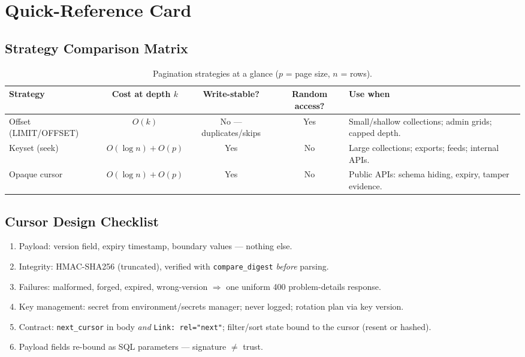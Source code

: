 \section{Quick-Reference Card}
\label{sec:ch8-quickref}

\subsection*{Strategy Comparison Matrix}
\begin{table}[h]
  \centering
  \small
  \begin{tabularx}{\textwidth}{l c c c X}
    \toprule
    \textbf{Strategy} & \textbf{Cost at depth $k$} & \textbf{Write-stable?} &
    \textbf{Random access?} & \textbf{Use when} \\
    \midrule
    Offset (LIMIT/OFFSET) & $O(k)$ & No --- duplicates/skips & Yes &
      Small/shallow collections; admin grids; capped depth. \\
    Keyset (seek) & $O(\log n) + O(p)$ & Yes & No &
      Large collections; exports; feeds; internal APIs. \\
    Opaque cursor & $O(\log n) + O(p)$ & Yes & No &
      Public APIs: schema hiding, expiry, tamper evidence. \\
    \bottomrule
  \end{tabularx}
  \caption{Pagination strategies at a glance ($p$ = page size, $n$ = rows).}
\end{table}

\subsection*{Cursor Design Checklist}
\begin{enumerate}
  \item Payload: version field, expiry timestamp, boundary values ---
        nothing else.
  \item Integrity: HMAC-SHA256 (truncated), verified with
        \texttt{compare\_digest} \emph{before} parsing.
  \item Failures: malformed, forged, expired, wrong-version $\Rightarrow$
        one uniform 400 problem-details response.
  \item Key management: secret from environment/secrets manager; never
        logged; rotation plan via key version.
  \item Contract: \texttt{next\_cursor} in body \emph{and} \texttt{Link:
        rel="next"}; filter/sort state bound to the cursor (resent or
        hashed).
  \item Payload fields re-bound as SQL parameters --- signature $\neq$
        trust.
\end{enumerate}

